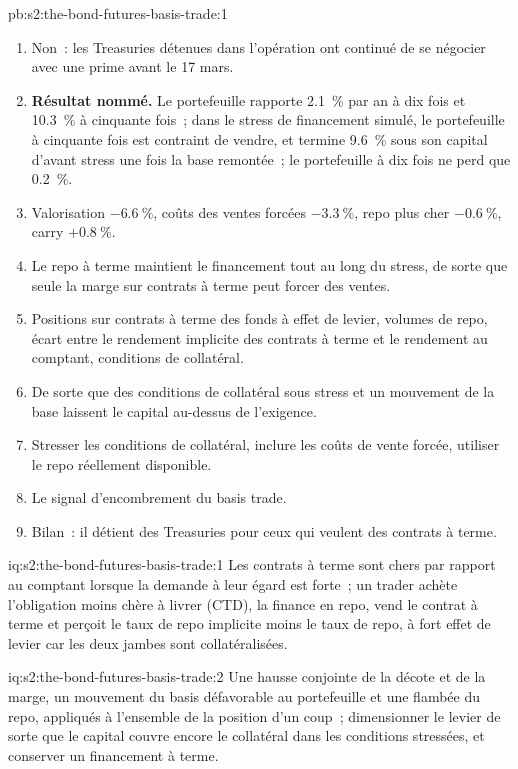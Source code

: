 \begin{solution}{pb:s2:the-bond-futures-basis-trade:1}
\begin{enumerate}
\item Non~: les Treasuries détenues dans l'opération ont continué de se négocier avec une prime avant le 17 mars.
\item \textbf{Résultat nommé.} Le portefeuille rapporte 2.1~\% par an à dix fois et 10.3~\% à cinquante fois~; dans le stress de financement simulé, le portefeuille à cinquante fois est contraint
de vendre, et termine 9.6~\% sous son capital d'avant stress une fois la base remontée~; le portefeuille à dix fois ne perd que 0.2~\%.
\item Valorisation $-6.6~\%$, coûts des ventes forcées $-3.3~\%$, repo plus cher $-0.6~\%$, carry $+0.8~\%$.
\item Le repo à terme maintient le financement tout au long du stress, de sorte que seule la marge sur contrats à terme peut forcer des ventes.
\item Positions sur contrats à terme des fonds à effet de levier, volumes de repo, écart entre le rendement implicite des contrats à terme et le rendement au comptant, conditions de collatéral.
\item De sorte que des conditions de collatéral sous stress et un mouvement de la base laissent le capital au-dessus de l'exigence.
\item Stresser les conditions de collatéral, inclure les coûts de vente forcée, utiliser le repo réellement disponible.
\item Le signal d'encombrement du basis trade.
\item Bilan~: il détient des Treasuries pour ceux qui veulent des contrats à terme.
\end{enumerate}
\end{solution}

\begin{solution}{iq:s2:the-bond-futures-basis-trade:1}
Les contrats à terme sont chers par rapport au comptant lorsque la demande à leur égard est forte~; un trader achète l'obligation moins chère à livrer (CTD), la finance en repo, vend le contrat à terme et perçoit
le taux de repo implicite moins le taux de repo, à fort effet de levier car les deux jambes sont collatéralisées.
\end{solution}

\begin{solution}{iq:s2:the-bond-futures-basis-trade:2}
Une hausse conjointe de la décote et de la marge, un mouvement du basis défavorable au portefeuille et une flambée du repo, appliqués à l'ensemble de la position d'un coup~; dimensionner le levier de sorte que
le capital couvre encore le collatéral dans les conditions stressées, et conserver un financement à terme.
\end{solution}

